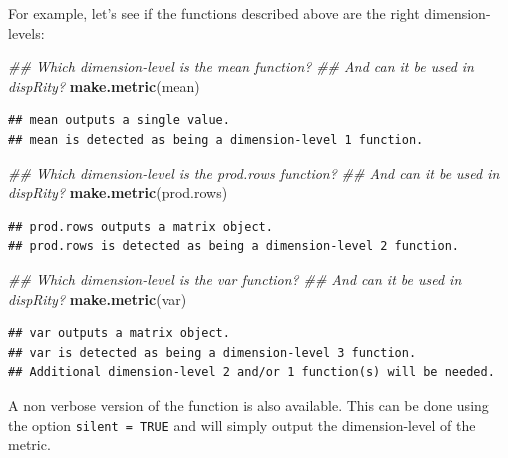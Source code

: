 \documentclass[]{book}
\newenvironment{Shaded}{\begin{snugshade}}{\end{snugshade}}
\newcommand{\CommentTok}[1]{\textcolor[rgb]{0.56,0.35,0.01}{\textit{#1}}}
\newcommand{\KeywordTok}[1]{\textcolor[rgb]{0.13,0.29,0.53}{\textbf{#1}}}
\newcommand{\NormalTok}[1]{#1}
\begin{document}
For example, let's see if the functions described above are the right dimension-levels:

\begin{Shaded}
\begin{Highlighting}[]
\CommentTok{## Which dimension-level is the mean function?}
\CommentTok{## And can it be used in dispRity?}
\KeywordTok{make.metric}\NormalTok{(mean)}
\end{Highlighting}
\end{Shaded}

\begin{verbatim}
## mean outputs a single value.
## mean is detected as being a dimension-level 1 function.
\end{verbatim}

\begin{Shaded}
\begin{Highlighting}[]
\CommentTok{## Which dimension-level is the prod.rows function?}
\CommentTok{## And can it be used in dispRity?}
\KeywordTok{make.metric}\NormalTok{(prod.rows)}
\end{Highlighting}
\end{Shaded}

\begin{verbatim}
## prod.rows outputs a matrix object.
## prod.rows is detected as being a dimension-level 2 function.
\end{verbatim}

\begin{Shaded}
\begin{Highlighting}[]
\CommentTok{## Which dimension-level is the var function?}
\CommentTok{## And can it be used in dispRity?}
\KeywordTok{make.metric}\NormalTok{(var)}
\end{Highlighting}
\end{Shaded}

\begin{verbatim}
## var outputs a matrix object.
## var is detected as being a dimension-level 3 function.
## Additional dimension-level 2 and/or 1 function(s) will be needed.
\end{verbatim}

A non verbose version of the function is also available.
This can be done using the option \texttt{silent\ =\ TRUE} and will simply output the dimension-level of the metric.
\end{document}
